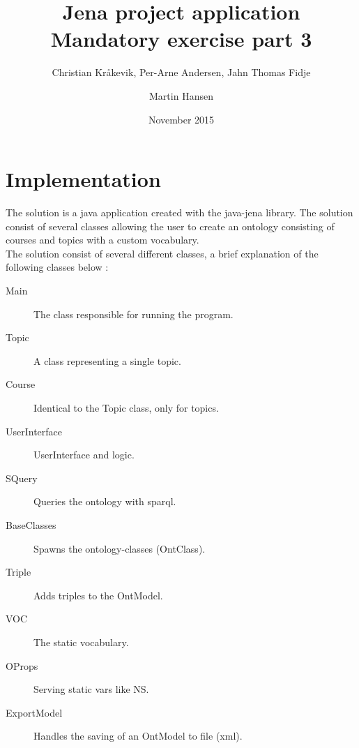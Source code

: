 \documentclass{article}
\title{Jena project application\\  \large Mandatory exercise part 3}
\author{Christian Kråkevik, Per-Arne Andersen, Jahn Thomas Fidje \and Martin Hansen}
\date{November 2015}
\begin{document}



\maketitle

\newpage

\section{Implementation}
The solution is a java application created with the java-jena library. The solution consist of several classes allowing the user
to create an ontology consisting of courses and topics with a custom vocabulary. \\


\noindent The solution consist of several different classes, a brief explanation of the following classes below :

\begin{description}
  \item[Main] The class responsible for running the program.
  \item[Topic] A class representing a single topic.
  \item[Course] Identical to the Topic class, only for topics.
  \item[UserInterface] UserInterface and logic.
  \item[SQuery] Queries the ontology with sparql.
  \item[BaseClasses] Spawns the ontology-classes (OntClass).
  \item[Triple] Adds triples to the OntModel.
  \item[VOC] The static vocabulary.
  \item[OProps] Serving static vars like NS.
  \item[ExportModel] Handles the saving of an OntModel to file (xml).
  \end{description}

  \vspace*{8px}
\end{document}
